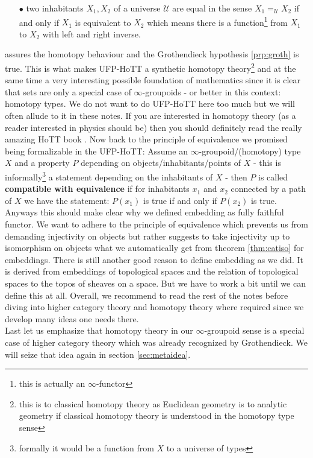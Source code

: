 \begin{enumerate}
\item[$\bullet$]
two inhabitants $X_{1},X_{2}$ of a universe $\mathcal{U}$ are equal in the sense $X_{1} =_{\mathcal{U}} X_{2}$ if and only if $X_{1}$ is equivalent to $X_{2}$ which means there is a function\footnote{this is actually an $\infty$-functor} from $X_{1}$ to $X_{2}$ with left and right inverse.
\end{enumerate}
assures the homotopy behaviour and the Grothendieck hypothesis \ref{prp:groth} is true. This is what makes UFP-HoTT a synthetic homotopy theory\footnote{this is to classical homotopy theory as Euclidean geometry is to analytic geometry if classical homotopy theory is understood in the homotopy type sense} and at the same time a very interesting possible foundation of mathematics since it is clear that sets are only a special case of $\infty$-groupoids - or better in this context: homotopy types. We do not want to do UFP-HoTT here too much but we will often allude to it in these notes. If you are interested in homotopy theory (as a reader interested in physics should be) then you should definitely read the really amazing HoTT book \cite{1ba1603e}. Now back to the principle of equivalence we promised being formalizable in the UFP-HoTT: Assume an $\infty$-groupoid/(homotopy) type $X$ and a property $P$ depending on objects/inhabitants/points of $X$ - this is informally\footnote{formally it would be a function from $X$ to a universe of types} a statement depending on the inhabitants of $X$ - then $P$ is called \textbf{compatible with equivalence} if for inhabitants $x_{1}$ and $x_{2}$ connected by a path of $X$ we have the statement: $P(x_{1})$ is true if and only if $P(x_{2})$ is true. Anyways this should make clear why we defined embedding as fully faithful functor. We want to adhere to the principle of equivalence which prevents us from demanding injectivity on objects but rather suggests to take injectivity up to isomorphism on objects what we automatically get from theorem \ref{thm:catiso} for embeddings. There is still another good reason to define embedding as we did. It is derived from embeddings of topological spaces and the relation of topological spaces to the {\glqq}topos of sheaves on a space{\grqq}. But we have to work a bit until we can define this at all. Overall, we recommend to read the rest of the notes before diving into higher category theory and homotopy theory where required since we develop many ideas one needs there.
\\
Last let us emphasize that homotopy theory in our $\infty$-groupoid sense is a special case of higher category theory which was already recognized by Grothendieck. We will seize that idea again in section \ref{sec:metaidea}.
